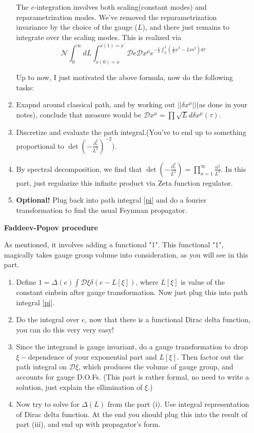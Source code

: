 \documentclass[11pt]{article}
\begin{document}
\begin{enumerate}
\begin{problem}{\points{-}}
\begin{enumerate}
			\noindent
			The $e$-integration involves both scaling(constant modes) and reparametrization modes. We've removed the reparametrization invariance by the choice of the gauge ($L$), and there just remains to integrate over the scaling modes. This is realized via
			\begin{equation}
				\mathcal{N}\int_{0}^{\infty} dL \int_{x(0) = x}^{x(1) = x^{\prime}} \mathcal{D}e \mathcal{D}x^\mu e^{-\frac12 \int_0^1 (\frac1{L}\dot{x}^2 - Lm^2) d\tau}
				\label{pi}
			\end{equation}
			
			\noindent
			Up to now, I just motivated the above formula, now do the following tasks:
		
				\item Exapnd around classical path, and by working out $||\delta x^\mu||$(as done in your notes), conclude that measure would be $\mathcal{D}x^\mu = \prod \sqrt{L} d\delta x^\mu(\tau)$.
				\item Discretize and evaluate the path integral.(You've to end up to something proportional to $\det(-\frac{\partial^2_\tau}{L^2})^{-2}$).
				\item By spectral decomposition, we find that $\det(-\frac{\partial^2_\tau}{L^2}) = \prod_{n=1}^{\infty} \frac{n^2}{L^2}$. In this part, just regularize this infinite product via Zeta function regulator.
			\item \textbf{Optional!} Plug back into path integral \eqref{pi} and do a fourier transformation to find the usual Feynman propagator.
		\end{enumerate}
	\end{problem}

\begin{problem}{\points{-}}
	\textbf{Faddeev-Popov procedure} 
	
	\noindent
	As mentioned, it involves adding a functional "1". This functional "1", magically takes gauge group volume into consideration, as you will see in this part.
	
	\begin{enumerate}
		\item Define $1 = \Delta(e) \int \mathcal{D}\xi \delta(e-L[\xi])$, where $L[\xi]$ is value of the constant einbein after gauge transformation. Now just plug this into path integral \eqref{pi}.
		\item Do the integral over $e$, now that there is a functional Dirac delta function, you can do this very very easy!
		\item Since the integrand is gauge invariant, do a gauge transformation to drop $\xi-$dependence of your exponential part and $L[\xi]$. Then factor out the path integral on $\mathcal{D}\xi$, which produces the volume of gauge group, and accounts for gauge D.O.Fs. (This part is rather formal, no need to write a solution, just explain the ellimination of $\xi$.)
		\item Now try to solve for $\Delta(L)$ from the part (i). Use integral representation of Dirac delta function. At the end you should plug this into the result of part (iii), and end up with propagator's form.
	\end{enumerate}
	

\end{problem}
\end{enumerate}
\end{document}
